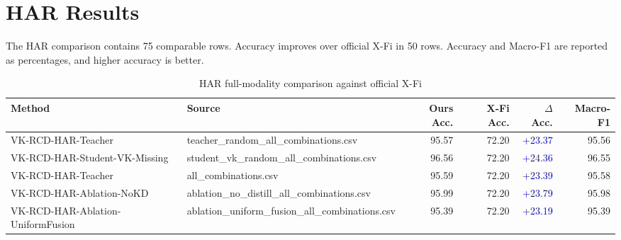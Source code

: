 \section{HAR Results}
The HAR comparison contains 75 comparable rows. Accuracy improves over official X-Fi in 50 rows. Accuracy and Macro-F1 are reported as percentages, and higher accuracy is better.
\begin{table}[htbp]\centering\caption{HAR full-modality comparison against official X-Fi}\begin{tabular}{llrrrr}\toprule
Method & Source & Ours Acc. & X-Fi Acc. & $\Delta$ Acc. & Macro-F1\\\midrule
VK-RCD-HAR-Teacher & teacher\_random\_all\_combinations.csv & 95.57 & 72.20 & \textcolor{blue}{+23.37} & 95.56\\
VK-RCD-HAR-Student-VK-Missing & student\_vk\_random\_all\_combinations.csv & 96.56 & 72.20 & \textcolor{blue}{+24.36} & 96.55\\
VK-RCD-HAR-Teacher & all\_combinations.csv & 95.59 & 72.20 & \textcolor{blue}{+23.39} & 95.58\\
VK-RCD-HAR-Ablation-NoKD & ablation\_no\_distill\_all\_combinations.csv & 95.99 & 72.20 & \textcolor{blue}{+23.79} & 95.98\\
VK-RCD-HAR-Ablation-UniformFusion & ablation\_uniform\_fusion\_all\_combinations.csv & 95.39 & 72.20 & \textcolor{blue}{+23.19} & 95.39\\
\bottomrule\end{tabular}\end{table}
